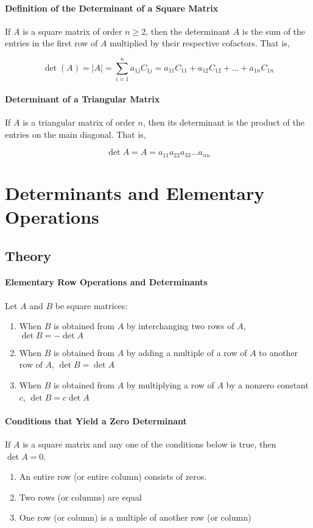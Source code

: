 \documentclass{report}
\begin{document}
\paragraph{Definition of the Determinant of a Square Matrix} If $A$ is a square matrix of order $n \ge 2$, then the determinant $A$ is the sum of the entries in the first row of $A$ multiplied by their respective cofactors. That is,

$$
\det(A) = |A| = \sum_{i=1}^{n} a_{1j}C_{1j} = a_{11}C_{11} + a_{12}C_{12} + \hdots + a_{1n}C_{1n}
$$

\paragraph{Determinant of a Triangular Matrix} If $A$ is a triangular matrix of order $n$, then its determinant is the product of the entries on the main diagonal. That is,

$$
\det{A} = A = a_{11}a_{22}a_{33} \hdots a_{nn}
$$

\section{Determinants and Elementary Operations}
\subsection{Theory}

\paragraph{Elementary Row Operations and Determinants}
Let $A$ and $B$ be square matrices:

\begin{enumerate}
    \item When $B$ is obtained from $A$ by interchanging two rows of $A$, $\det{B} = -\det{A}$
    \item When $B$ is obtained from $A$ by adding  a multiple of a row of $A$ to another row of $A$, $\det{B} = \det{A}$
    \item When $B$ is obtained from $A$ by multiplying a row of $A$ by a nonzero constant $c$, $\det{B}=c\det{A}$
\end{enumerate}

\paragraph{Conditions that Yield a Zero Determinant} If $A$ is a square matrix and any one of the conditions below is true, then $\det{A}=0$.
\begin{enumerate}
    \item An entire row (or entire column) consists of zeros.
    \item Two rows (or columns) are equal
    \item One row (or column) is a multiple of another row (or column)
\end{enumerate}
\end{document}
